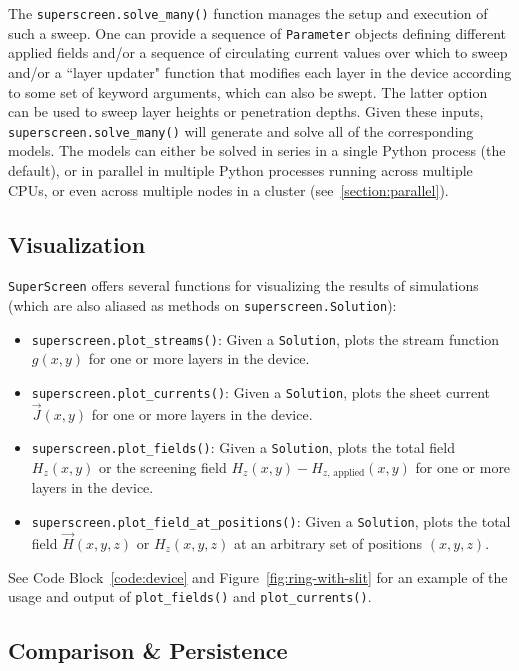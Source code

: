 \documentclass[final,3p,times,twocolumn]{elsarticle}
\newcommand{\inline}[1]{\texttt{#1}\xspace}
\newcommand{\SuperScreen}{\inline{SuperScreen}}
\begin{document}
The \inline{superscreen.solve_many()} function manages the setup and execution of such a sweep. One can provide a sequence of \inline{Parameter} objects defining different applied fields and/or a sequence of circulating current values over which to sweep and/or a ``layer updater" function that modifies each layer in the device according to some set of keyword arguments, which can also be swept. The latter option can be used to sweep layer heights or penetration depths. Given these inputs, \inline{superscreen.solve_many()} will generate and solve all of the corresponding models. The models can either be solved in series in a single Python process (the default), or in parallel in multiple Python processes running across multiple CPUs, or even across multiple nodes in a cluster (see~\ref{section:parallel}).

\subsection{Visualization}
\label{section:overview:visualization}

\SuperScreen offers several functions for visualizing the results of simulations (which are also aliased as methods on \inline{superscreen.Solution}):

\begin{itemize}
    \item{
    \inline{superscreen.plot_streams()}: Given a \inline{Solution}, plots the stream function $g(x, y)$ for one or more layers in the device.
    }
    \item{
    \inline{superscreen.plot_currents()}: Given a \inline{Solution}, plots the sheet current $\vec{J}(x, y)$ for one or more layers in the device.
    }
    \item{
    \inline{superscreen.plot_fields()}: Given a \inline{Solution}, plots the total field $H_z(x, y)$ or the screening field $H_z(x, y) - H_{z,\,\mathrm{applied}}(x, y)$ for one or more layers in the device.
    }
    \item{
    \inline{superscreen.plot_field_at_positions()}: Given a \inline{Solution}, plots the total field $\vec{H}(x, y, z)$ or $H_z(x, y, z)$ at an arbitrary set of positions $(x, y, z)$.
    }
\end{itemize}

See Code Block~\ref{code:device} and  Figure~\ref{fig:ring-with-slit} for an example of the usage and output of \inline{plot_fields()} and \inline{plot_currents()}.

\subsection{Comparison \& Persistence}
\label{section:overview:persistence}
\end{document}
